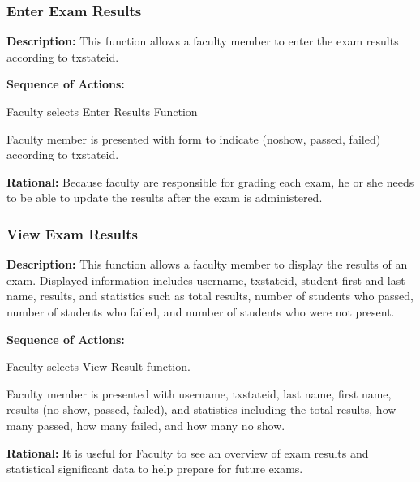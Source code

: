    \subsubsection{\large Enter Exam Results} 
   \begin{boxed} %
      \textbf{Description:}
      {\small This function allows a faculty member to enter the exam results
         according to txstateid.}
         
         \textbf{Sequence of Actions:}
         \begin{enumerate}
               {\small
            \item Faculty selects Enter Results Function
            \item Faculty member is presented with form to indicate (noshow,
               passed, failed) according to txstateid. }
         \end{enumerate}

         \textbf{Rational:}
         {\small Because faculty are responsible for grading each exam, he or she needs
         to be able to update the results after the exam is administered.}
   \end{boxed} %

   \subsubsection{\large View Exam Results} 
   \begin{boxed} %
      \textbf{Description:}
      {\small This function allows a faculty member to display the results of an
         exam. Displayed information includes username, txstateid, student
         first and last name, results, and statistics such as total results,
         number of students who passed, number of students who
         failed, and number of students who were not present.}
         
         \textbf{Sequence of Actions:}
         \begin{enumerate}
               {\small
            \item Faculty selects View Result function.
            \item Faculty member is presented with username, txstateid, last
               name, first name, results (no show, passed, failed), and
               statistics including the total results, how many passed, how many
               failed, and how many no show. }
         \end{enumerate}

         \textbf{Rational:}
         {\small It is useful for Faculty to see an overview of exam results and
         statistical significant data to help prepare for future exams.}
   \end{boxed} %

